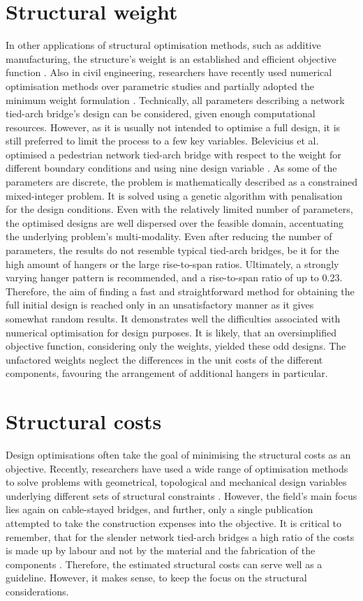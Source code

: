 \section{Structural weight} \label{sec:rev_weight}
In other applications of structural optimisation methods, such as additive manufacturing, the structure's weight is an established and efficient objective function \cite{Plocher}.
Also in civil engineering, researchers have recently used numerical optimisation methods over parametric studies and partially adopted the minimum weight formulation \cite{MARTINS}.
Technically, all parameters describing a network tied-arch bridge's design can be considered, given enough computational resources. 
However, as it is usually not intended to optimise a full design, it is still preferred to limit the process to a few key variables. 
Belevicius et al. optimised a pedestrian network tied-arch bridge with respect to the weight for different boundary conditions and using nine design variable \cite{Belevicius}. 
As some of the parameters are discrete, the problem is mathematically described as a constrained mixed-integer problem. It is solved using a genetic algorithm with penalisation for the design conditions.
Even with the relatively limited number of parameters, the optimised designs are well dispersed over the feasible domain, accentuating the underlying problem's multi-modality.
Even after reducing the number of parameters, the results do not resemble typical tied-arch bridges, be it for the high amount of hangers or the large rise-to-span ratios. 
Ultimately, a strongly varying hanger pattern is recommended, and a rise-to-span ratio of up to 0.23.
Therefore, the aim of finding a fast and straightforward method for obtaining the full initial design is reached only in an unsatisfactory manner as it gives somewhat random results.
It demonstrates well the difficulties associated with numerical optimisation for design purposes. 
It is likely, that an oversimplified objective function, considering only the weights, yielded these odd designs. 
The unfactored weights neglect the differences in the unit costs of the different components, favouring the arrangement of additional hangers in particular.


\section{Structural costs} \label{sec:rev_cost}
Design optimisations often take the goal of minimising the structural costs as an objective. Recently, researchers have used a wide range of optimisation methods to solve problems with geometrical, topological and mechanical design variables underlying different sets of structural constraints \cite{MARTINS}. However, the field's main focus lies again on cable-stayed bridges, and further, only a single publication attempted to take the construction expenses into the objective. It is critical to remember, that for the slender network tied-arch bridges a high ratio of the costs is made up by labour and not by the material and the fabrication of the components \cite{Tveit_How}. Therefore, the estimated structural costs can serve well as a guideline. However, it makes sense, to keep the focus on the structural considerations.

